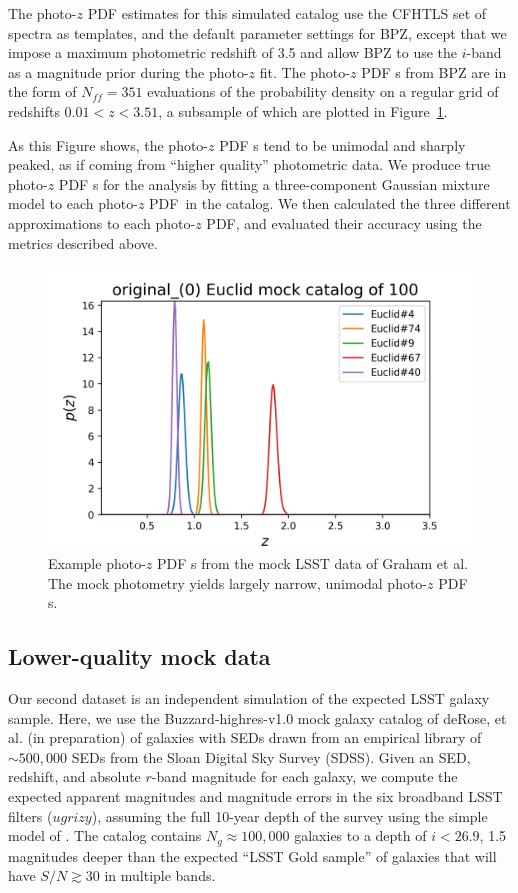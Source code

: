 \documentclass[\docopts]{\docclass}
\newcommand{\pz}{photo-$z$ PDF\xspace}
\begin{document}
The \pz estimates for this simulated catalog use the CFHTLS set of spectra
\citep{ilbert_accurate_2006} as templates, and the default parameter settings for BPZ, except
that we impose a maximum photometric redshift of 3.5 and allow BPZ to use the
$i$-band as a magnitude prior during the photo-$z$ fit. The \pz s from BPZ are
in the form of $N_{ff} = 351$ evaluations of the probability density on a
regular grid of redshifts $0.01 < z < 3.51$, a subsample of which are plotted
in Figure~\ref{fig:graham_pzs}.

As this Figure shows, the \pz s tend to be unimodal and sharply peaked, as if coming from ``higher quality'' photometric data.
We produce true \pz s for the analysis by
fitting a three-component Gaussian mixture model to each \pz\ in the catalog. We then calculated the three different approximations to each \pz, and evaluated their accuracy using the metrics described above.

\begin{figure}
  \includegraphics[width=0.9\columnwidth]{figures/graham_pzs.png}
  \caption{Example \pz s from the mock LSST data of Graham et al. The mock photometry yields largely narrow, unimodal \pz s.
  \label{fig:graham_pzs}}
\end{figure}


\subsection{Lower-quality mock data}
\label{sec:LSST}

Our second dataset is an independent simulation of the expected LSST galaxy sample. Here, we use the
Buzzard-highres-v1.0 mock galaxy catalog of deRose, et al. (in preparation) of
galaxies with SEDs drawn from an empirical library of $\sim500,000$ SEDs from
the Sloan Digital Sky Survey (SDSS).
Given an SED, redshift, and absolute $r$-band magnitude for each galaxy, we
compute the expected apparent magnitudes and magnitude errors in the six
broadband LSST filters ($ugrizy$), assuming the full 10-year depth of the survey
using the simple model of \citet{ivezic_lsst:_2008}.  The catalog contains
$N_{g}\approx100,000$ galaxies to a depth of $i<26.9$, 1.5 magnitudes deeper
than the expected ``LSST Gold sample'' of galaxies that will have $S/N\gtrsim30$
in multiple bands.
\end{document}
